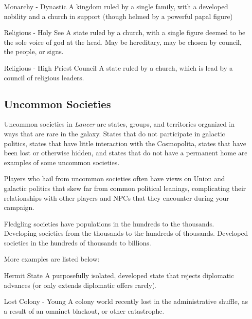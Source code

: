  Monarchy - Dynastic                                   A kingdom ruled by a single family, with a
                                                       developed nobility and a church in support
                                                       (though helmed by a powerful papal figure)

 Religious - Holy See                                  A state ruled by a church, with a single figure
                                                       deemed to be the sole voice of god at the
                                                       head. May be hereditary, may be chosen by
                                                       council, the people, or signs.

 Religious - High Priest Council                       A state ruled by a church, which is lead by a
                                                       council of religious leaders.

\subsection{Uncommon Societies}

Uncommon societies in \textit{Lancer} are states, groups, and territories organized in ways that are rare
in the galaxy. States that do not participate in galactic politics, states that have little interaction
with the Cosmopolita, states that have been lost or otherwise hidden, and states that do not
have a permanent home are examples of some uncommon societies.

Players who hail from uncommon societies often have views on Union and galactic politics that
skew far from common political leanings, complicating their relationships with other players and
NPCs that they encounter during your campaign.

Fledgling societies have populations in the hundreds to the thousands. Developing societies
from the thousands to the hundreds of thousands. Developed societies in the hundreds of
thousands to billions.

More examples are listed below:

             Hermit State                         A purposefully isolated, developed state that rejects
                                                  diplomatic advances (or only extends diplomatic
                                                  offers rarely).

             Lost Colony - Young                  A colony world recently lost in the administrative
                                                  shuffle, as a result of an omninet blackout, or other
                                                  catastrophe.

